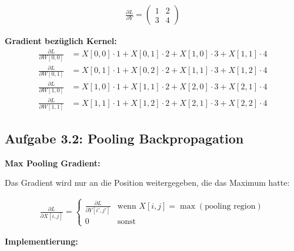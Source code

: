 ﻿\documentclass[12pt,a4paper]{article}
\begin{document}
\begin{align}
\frac{\partial L}{\partial Y} = \begin{pmatrix} 1 & 2 \\ 3 & 4 \end{pmatrix}
\end{align}

\textbf{Gradient bezüglich Kernel:}
\begin{align}
\frac{\partial L}{\partial W[0,0]} &= X[0,0] \cdot 1 + X[0,1] \cdot 2 + X[1,0] \cdot 3 + X[1,1] \cdot 4 \\
\frac{\partial L}{\partial W[0,1]} &= X[0,1] \cdot 1 + X[0,2] \cdot 2 + X[1,1] \cdot 3 + X[1,2] \cdot 4 \\
\frac{\partial L}{\partial W[1,0]} &= X[1,0] \cdot 1 + X[1,1] \cdot 2 + X[2,0] \cdot 3 + X[2,1] \cdot 4 \\
\frac{\partial L}{\partial W[1,1]} &= X[1,1] \cdot 1 + X[1,2] \cdot 2 + X[2,1] \cdot 3 + X[2,2] \cdot 4
\end{align}

\subsection{Aufgabe 3.2: Pooling Backpropagation}

\textbf{Max Pooling Gradient:}

Das Gradient wird nur an die Position weitergegeben, die das Maximum hatte:

\begin{align}
\frac{\partial L}{\partial X[i,j]} = \begin{cases}
\frac{\partial L}{\partial Y[i',j']} & \text{wenn } X[i,j] = \max(\text{pooling region}) \\
0 & \text{sonst}
\end{cases}
\end{align}

\textbf{Implementierung:}
\end{document}
